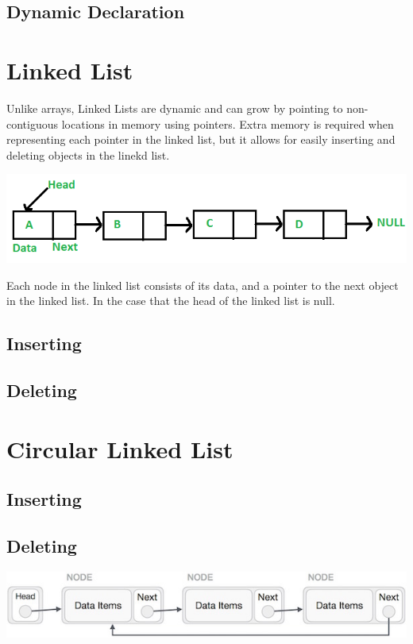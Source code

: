 \documentclass[11pt]{article}
\begin{document}
\subsection{Dynamic Declaration}
\section{Linked List}
Unlike arrays, Linked Lists are dynamic and can grow by pointing to non-contiguous locations in memory using pointers. Extra memory is required when representing each pointer in the linked list, but it allows for easily inserting and deleting objects in the linekd list.
\begin{center}
    \includegraphics[width=250 px]{img/linkedlist}  \\
\end{center}
Each node in the linked list consists of its data, and a pointer to the next object in the linked list. In the case that the head of the linked list is null.


\subsection{Inserting}



\subsection{Deleting}



\section{Circular Linked List}



\subsection{Inserting}



\subsection{Deleting}

\begin{center}
    \includegraphics[width=350 px]{img/circularlinkedlist}  \\
\end{center}
\end{document}
